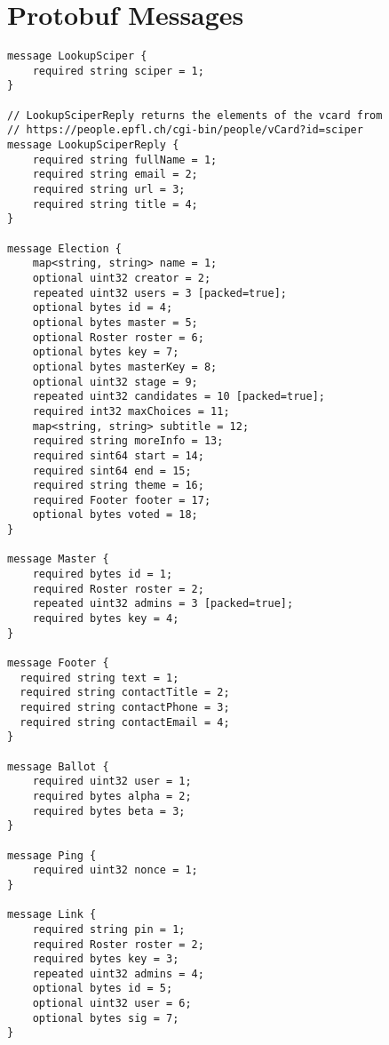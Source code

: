
\chapter{Protobuf Messages} %

\label{AppendixA} %


\begin{lstlisting}[caption={Protobuf API Specification}, captionpos=b, language=protobuf2, style=protobuf]
message LookupSciper {
	required string sciper = 1;
}

// LookupSciperReply returns the elements of the vcard from
// https://people.epfl.ch/cgi-bin/people/vCard?id=sciper
message LookupSciperReply {
	required string fullName = 1;
	required string email = 2;
	required string url = 3;
	required string title = 4;
}

message Election {
    map<string, string> name = 1;
    optional uint32 creator = 2;
    repeated uint32 users = 3 [packed=true];
    optional bytes id = 4;
    optional bytes master = 5;
    optional Roster roster = 6;
    optional bytes key = 7;
    optional bytes masterKey = 8;
    optional uint32 stage = 9;
    repeated uint32 candidates = 10 [packed=true];
    required int32 maxChoices = 11;
    map<string, string> subtitle = 12;
    required string moreInfo = 13;
    required sint64 start = 14;
    required sint64 end = 15;
    required string theme = 16;
    required Footer footer = 17;
    optional bytes voted = 18;
}

message Master {
    required bytes id = 1;
    required Roster roster = 2;
    repeated uint32 admins = 3 [packed=true];
    required bytes key = 4;
}

message Footer {
  required string text = 1;
  required string contactTitle = 2;
  required string contactPhone = 3;
  required string contactEmail = 4;
}

message Ballot {
    required uint32 user = 1;
    required bytes alpha = 2;
    required bytes beta = 3;
}

message Ping {
    required uint32 nonce = 1;
}

message Link {
    required string pin = 1;
    required Roster roster = 2;
    required bytes key = 3;
    repeated uint32 admins = 4;
    optional bytes id = 5;
    optional uint32 user = 6;
    optional bytes sig = 7;
}


\end{lstlisting}
